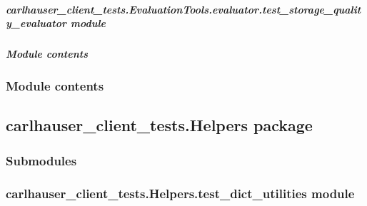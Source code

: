 \documentclass[letterpaper,10pt,english]{sphinxmanual}
\begin{document}
\subparagraph{carlhauser\_client\_tests.EvaluationTools.evaluator.test\_storage\_quality\_evaluator module}
\label{\detokenize{carlhauser_client_tests.EvaluationTools.evaluator:carlhauser-client-tests-evaluationtools-evaluator-test-storage-quality-evaluator-module}}

\subparagraph{Module contents}
\label{\detokenize{carlhauser_client_tests.EvaluationTools.evaluator:module-carlhauser_client_tests.EvaluationTools.evaluator}}\label{\detokenize{carlhauser_client_tests.EvaluationTools.evaluator:module-contents}}

\subsubsection{Module contents}
\label{\detokenize{carlhauser_client_tests.EvaluationTools:module-carlhauser_client_tests.EvaluationTools}}\label{\detokenize{carlhauser_client_tests.EvaluationTools:module-contents}}

\subsection{carlhauser\_client\_tests.Helpers package}
\label{\detokenize{carlhauser_client_tests.Helpers:carlhauser-client-tests-helpers-package}}\label{\detokenize{carlhauser_client_tests.Helpers::doc}}

\subsubsection{Submodules}
\label{\detokenize{carlhauser_client_tests.Helpers:submodules}}

\subsubsection{carlhauser\_client\_tests.Helpers.test\_dict\_utilities module}
\label{\detokenize{carlhauser_client_tests.Helpers:module-carlhauser_client_tests.Helpers.test_dict_utilities}}\label{\detokenize{carlhauser_client_tests.Helpers:carlhauser-client-tests-helpers-test-dict-utilities-module}}
\end{document}
